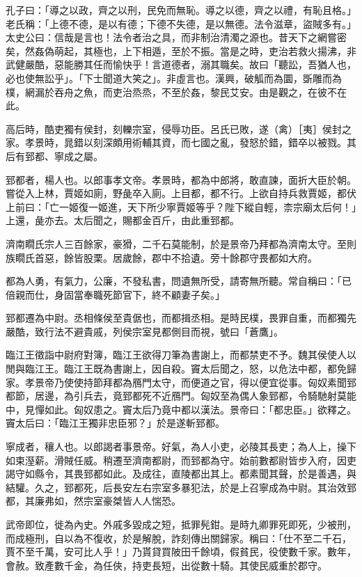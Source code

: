 
\begin{pinyinscope}
孔子曰：「導之以政，齊之以刑，民免而無恥。導之以德，齊之以禮，有恥且格。」老氏稱：「上德不德，是以有德；下德不失德，是以無德。法令滋章，盜賊多有。」太史公曰：信哉是言也！法令者治之具，而非制治清濁之源也。昔天下之網嘗密矣，然姦偽萌起，其極也，上下相遁，至於不振。當是之時，吏治若救火揚沸，非武健嚴酷，惡能勝其任而愉快乎！言道德者，溺其職矣。故曰「聽訟，吾猶人也，必也使無訟乎」。「下士聞道大笑之」。非虛言也。漢興，破觚而為圜，斲雕而為樸，網漏於吞舟之魚，而吏治烝烝，不至於姦，黎民艾安。由是觀之，在彼不在此。

高后時，酷吏獨有侯封，刻轢宗室，侵辱功臣。呂氏已敗，遂（禽）［夷］侯封之家。孝景時，晁錯以刻深頗用術輔其資，而七國之亂，發怒於錯，錯卒以被戮。其后有郅都、寧成之屬。

郅都者，楊人也。以郎事孝文帝。孝景時，都為中郎將，敢直諫，面折大臣於朝。嘗從入上林，賈姬如廁，野彘卒入廁。上目都，都不行。上欲自持兵救賈姬，都伏上前曰：「亡一姬復一姬進，天下所少寧賈姬等乎？陛下縱自輕，柰宗廟太后何！」上還，彘亦去。太后聞之，賜都金百斤，由此重郅都。

濟南瞯氏宗人三百餘家，豪猾，二千石莫能制，於是景帝乃拜都為濟南太守。至則族瞯氏首惡，餘皆股栗。居歲餘，郡中不拾遺。旁十餘郡守畏都如大府。

都為人勇，有氣力，公廉，不發私書，問遺無所受，請寄無所聽。常自稱曰：「已倍親而仕，身固當奉職死節官下，終不顧妻子矣。」

郅都遷為中尉。丞相條侯至貴倨也，而都揖丞相。是時民樸，畏罪自重，而都獨先嚴酷，致行法不避貴戚，列侯宗室見都側目而視，號曰「蒼鷹」。

臨江王徵詣中尉府對簿，臨江王欲得刀筆為書謝上，而都禁吏不予。魏其侯使人以閒與臨江王。臨江王既為書謝上，因自殺。竇太后聞之，怒，以危法中都，都免歸家。孝景帝乃使使持節拜都為鴈門太守，而便道之官，得以便宜從事。匈奴素聞郅都節，居邊，為引兵去，竟郅都死不近鴈門。匈奴至為偶人象郅都，令騎馳射莫能中，見憚如此。匈奴患之。竇太后乃竟中都以漢法。景帝曰：「都忠臣。」欲釋之。竇太后曰：「臨江王獨非忠臣邪？」於是遂斬郅都。

寧成者，穰人也。以郎謁者事景帝。好氣，為人小吏，必陵其長吏；為人上，操下如束溼薪。滑賊任威。稍遷至濟南都尉，而郅都為守。始前數都尉皆步入府，因吏謁守如縣令，其畏郅都如此。及成往，直陵都出其上。都素聞其聲，於是善遇，與結驩。久之，郅都死，后長安左右宗室多暴犯法，於是上召寧成為中尉。其治效郅都，其廉弗如，然宗室豪桀皆人人惴恐。

武帝即位，徙為內史。外戚多毀成之短，抵罪髡鉗。是時九卿罪死即死，少被刑，而成極刑，自以為不復收，於是解脫，詐刻傳出關歸家。稱曰：「仕不至二千石，賈不至千萬，安可比人乎！」乃貰貸買陂田千餘頃，假貧民，役使數千家。數年，會赦。致產數千金，為任俠，持吏長短，出從數十騎。其使民威重於郡守。


\end{pinyinscope}
